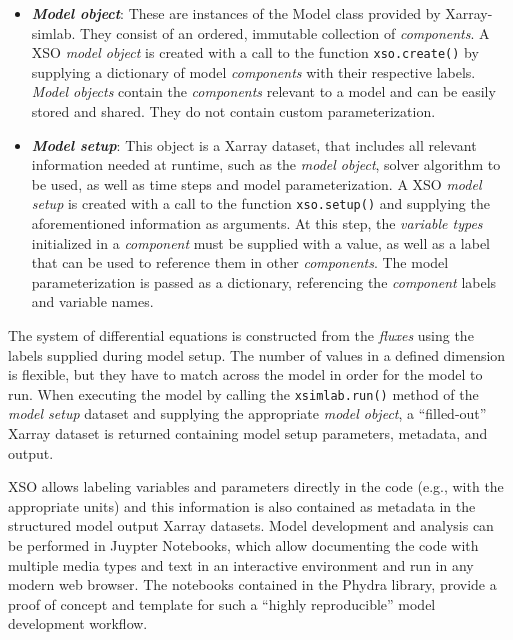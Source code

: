 \documentclass[gmd, manuscript]{copernicus}
\begin{document}
\begin{itemize}
    \item \textbf{\textit{Model object}}: These are instances of the Model class provided by Xarray-simlab. They consist of an ordered, immutable collection of \textit{components}. A XSO \textit{model object} is created with a call to the function \texttt{xso.create()} by supplying a dictionary of model \textit{components} with their respective labels. \textit{Model objects} contain the \textit{components} relevant to a model and can be easily stored and shared. They do not contain custom parameterization.

   \item \textbf{\textit{Model setup}}: This object is a Xarray dataset, that includes all relevant information needed at runtime, such as the \textit{model object}, solver algorithm to be used, as well as time steps and model parameterization. A XSO \textit{model setup} is created with a call to the function \texttt{xso.setup()} and supplying the aforementioned information as arguments. At this step, the \textit{variable types} initialized in a \textit{component} must be supplied with a value, as well as a label that can be used to reference them in other \textit{components}. The model parameterization is passed as a dictionary, referencing the \textit{component} labels and variable names.
\end{itemize}

The system of differential equations is constructed from the \textit{fluxes} using the labels supplied during model setup. The number of values in a defined dimension is flexible, but they have to match across the model in order for the model to run. When executing the model by calling the \texttt{xsimlab.run()} method of the \textit{model setup} dataset and supplying the appropriate \textit{model object}, a “filled-out” Xarray dataset is returned containing model setup parameters, metadata, and output.

XSO allows labeling variables and parameters directly in the code (e.g., with the appropriate units) and this information is also contained as metadata in the structured model output Xarray datasets. Model development and analysis can be performed in Juypter Notebooks, which allow documenting the code with multiple media types and text in an interactive environment and run in any modern web browser. The notebooks contained in the Phydra library, provide a proof of concept and template for such a “highly reproducible” model development workflow.
\end{document}
